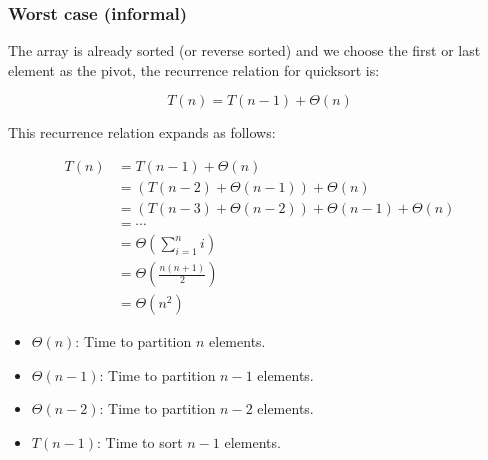     \subsubsection{Worst case (informal)}
        \begin{derivation}
            The array is already sorted (or reverse sorted) and we choose the first or last element as the pivot, the recurrence relation for quicksort is:

            \[
            T(n) = T(n-1) + \Theta(n)
            \]

            \begin{center}
            \end{center}

            \noindent This recurrence relation expands as follows:

            \begin{align*}
                T(n) &= T(n-1) + \Theta(n) \\
                    &= \left(T(n-2) + \Theta(n-1)\right) + \Theta(n) \\
                    &= \left(T(n-3) + \Theta(n-2)\right) + \Theta(n-1) + \Theta(n) \\
                    &= \cdots \\
                    &= \Theta\left(\sum_{i=1}^{n} i\right) \\
                    &= \Theta\left(\frac{n(n+1)}{2}\right) \\
                    &= \Theta(n^2)
            \end{align*}
            \begin{itemize}
                \item $\Theta(n)$: Time to partition $n$ elements.
                \item $\Theta(n-1)$: Time to partition $n-1$ elements.
                \item $\Theta(n-2)$: Time to partition $n-2$ elements.
                \item $T(n-1)$: Time to sort $n-1$ elements.
            \end{itemize}
        \end{derivation}

